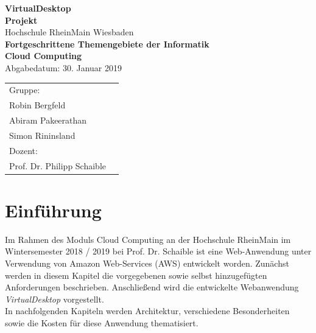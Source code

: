 \documentclass[a4paper, 12pt]{scrreprt}
\renewcommand\_{\textunderscore\allowbreak}
\begin{document}
\begin{titlepage}
    \begin{center}
    \LARGE \textbf{VirtualDesktop} \\
    \vspace{2.5cm}
    \large\textbf{Projekt}\\
    \vspace{2.5cm}
    \normalsize
    Hochschule RheinMain Wiesbaden \\
    \vspace{2cm}
    \large \textbf{Fortgeschrittene Themengebiete der Informatik\\ Cloud Computing\\}
    \vspace{1cm}
    \normalsize
    Abgabedatum: 30. Januar 2019\\
    \vspace{2.7cm}
    \end{center}
 \normalsize{
    \begin{tabular}{ll}
    	Gruppe: & \\
    	Robin Bergfeld & \\
    	Abiram Pakeerathan & \\
    	Simon Rininsland & \\[0.5cm]
    	Dozent: &\\
        Prof. Dr. Philipp Schaible & \\
    \end{tabular}
    }
\end{titlepage}



\clearpage
\tableofcontents
\clearpage



\chapter{Einführung}
Im Rahmen des Moduls Cloud Computing an der Hochschule RheinMain im Wintersemester 2018 / 2019 bei Prof. Dr. Schaible ist eine Web-Anwendung unter Verwendung von Amazon Web-Services (AWS) entwickelt worden. Zunächst werden in diesem Kapitel die vorgegebenen sowie selbst hinzugefügten Anforderungen beschrieben. Anschließend wird die entwickelte Webanwendung \textit{VirtualDesktop} vorgestellt.\\ 
In nachfolgenden Kapiteln werden Architektur, verschiedene Besonderheiten sowie die Kosten für diese Anwendung thematisiert.
\end{document}
